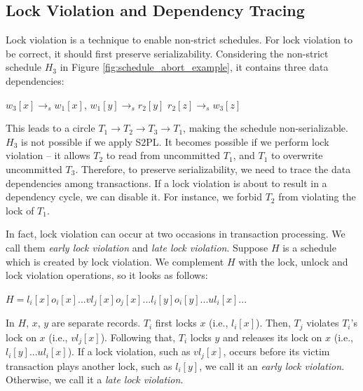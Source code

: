 \documentclass[conference]{IEEEtran}
\begin{document}

\subsection{Lock Violation and Dependency Tracing}

Lock violation is a technique to enable non-strict schedules.
For lock violation to be correct, it should first preserve serializability.
Considering the non-strict schedule ${H_3}$ in Figure \ref{fig:schedule_abort_example},
it contains three data dependencies:

\begin{center}
${w_3[x] \rightarrow _s w_1[x]}$,
${w_1[y] \rightarrow _s r_2[y]}$
${r_2[z] \rightarrow _s w_3[z]}$
\end{center}

This leads to a circle ${T_1 \rightarrow T_2 \rightarrow T_3 \rightarrow T_1}$, making the schedule non-serializable.
${H_3}$ is not possible if we apply S2PL. It becomes possible if we perform lock violation -- it allows
${T_2}$ to read from uncommitted ${T_1}$, and ${T_1}$ to overwrite uncommitted ${T_3}$.
Therefore, to preserve serializability, we need to trace the data dependencies among transactions. 
If a lock violation is about to result in a dependency cycle, we can disable it.
For instance, we forbid ${T_2}$ from violating the lock of ${T_1}$.

In fact, lock violation can occur at two occasions in transaction processing.
We call them \emph{early lock violation} and \emph{late lock violation}.
Suppose ${H}$ is a schedule which is created by lock violation. We complement ${H}$  with the lock, unlock and lock violation operations,
so it looks as follows:
\begin{center}
  ${H = l_i[x] o_i[x]... vl_j[x] o_j[x]...  l_i[y] o_i[y]... ul_i[x] ... }$
\end{center}
In ${H}$, ${x}$, ${y}$ are separate records.
${T_i}$ first locks ${x}$ (i.e., $l_i[x]$).
Then, ${T_j}$ violates  ${T_i}$'s lock on ${x}$ (i.e., $vl_j[x]$).
Following that, ${T_i}$ locks ${y}$ and releases its lock on ${x}$ (i.e., $l_i[y]... ul_i[x]$).
If a lock violation, such as $vl_j[x]$, occurs before its victim transaction plays another lock, such as $l_i[y]$,
we call it an \emph{early lock violation}.
Otherwise, we call it a \emph{late lock violation}.
\end{document}
